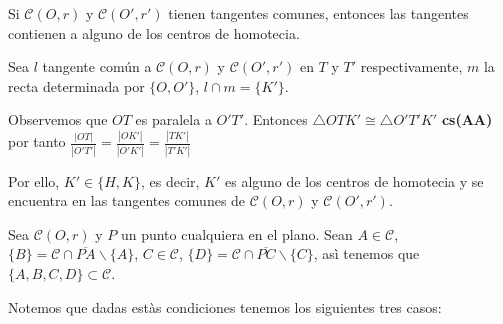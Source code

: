 \begin{teo}
Si $\mathcal{C}(O,r)$ y $\mathcal{C}(O',r')$ tienen tangentes comunes, entonces las tangentes contienen a alguno de los centros de homotecia. 
\end{teo}
\begin{dem}
Sea $l$ tangente común a $\mathcal{C}(O,r)$ y $\mathcal{C}(O',r')$ en $T$ y $T'$ respectivamente, $m$ la recta determinada por $\{O,O'\}$, $l\cap m=\{K'\}$.

Observemos que $OT$ es paralela a $O'T'$. Entonces $\triangle OTK'\cong\triangle O'T'K'$ \textbf{cs(AA)} por tanto $\frac{|OT|}{|O'T'|}=\frac{|OK'|}{|O'K'|}=\frac{|TK'|}{|T'K'|}$

Por ello, $K'\in\{H,K\}$, es decir, $K'$ es alguno de los centros de homotecia y se encuentra en las tangentes comunes de $\mathcal{C}(O,r)$ y $\mathcal{C}(O',r')$.
\end{dem}

Sea $\mathcal{C}(O,r)$ y $P$ un punto cualquiera en el plano. 
Sean $A\in\mathcal{C}$, $\{B\}=\mathcal{C}\cap\overline{PA}\backslash\{A\}$, $C\in\mathcal{C}$, $\{D\}=\mathcal{C}\cap\overline{PC}\backslash\{C\}$, asì tenemos que $\{A,B,C,D\}\subset\mathcal{C}$. 

Notemos que dadas estàs condiciones tenemos los siguientes tres casos:

